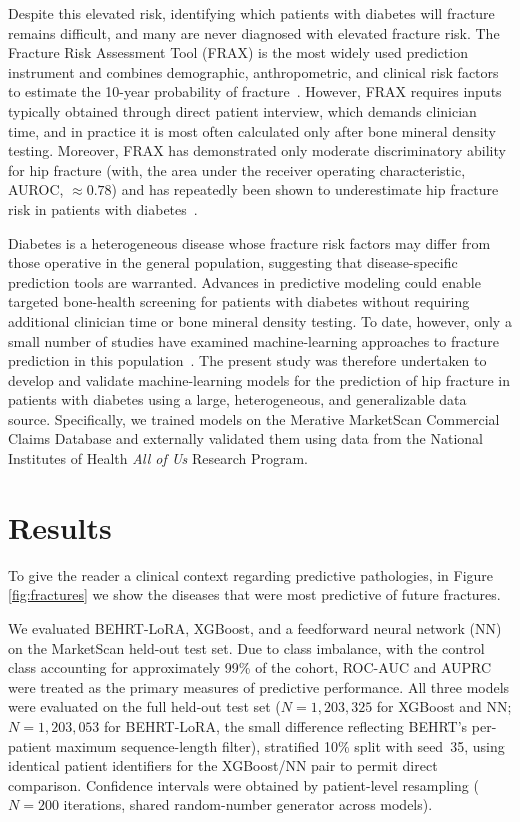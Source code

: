 \documentclass[12pt]{article}
\begin{document}
Despite this elevated risk, identifying which patients with diabetes will fracture remains difficult, and many are never diagnosed with elevated fracture risk. The Fracture Risk Assessment Tool (FRAX) is the most widely used prediction instrument and combines demographic, anthropometric, and clinical risk factors to estimate the 10-year probability of fracture~\citep{Kanis2010FRAX}. However, FRAX requires inputs typically obtained through direct patient interview, which demands clinician time, and in practice it is most often calculated only after bone mineral density testing. Moreover, FRAX has demonstrated only moderate discriminatory ability for hip fracture (with, the area under the receiver operating characteristic, AUROC, $\approx 0.78$) and has repeatedly been shown to underestimate hip fracture risk in patients with diabetes~\citep{Giangregorio2012JBMR,Beaudoin2019OsteoInt,Jain2025JBMR}.

Diabetes is a heterogeneous disease whose fracture risk factors may differ from those operative in the general population, suggesting that disease-specific prediction tools are warranted. Advances in predictive modeling could enable targeted bone-health screening for patients with diabetes without requiring additional clinician time or bone mineral density testing. To date, however, only a small number of studies have examined machine-learning approaches to fracture prediction in this population~\citep{Li2023JOSR}. The present study was therefore undertaken to develop and validate machine-learning models for the prediction of hip fracture in patients with diabetes using a large, heterogeneous, and generalizable data source. Specifically, we trained models on the Merative MarketScan Commercial Claims Database and externally validated them using data from the National Institutes of Health \textit{All of Us} Research Program.


\section{Results}

To give the reader a clinical context regarding predictive pathologies, in Figure \ref{fig:fractures} we show the diseases that were most predictive of future fractures.

We evaluated BEHRT-LoRA, XGBoost, and a feedforward neural network (NN) on the MarketScan held-out test set. Due to class imbalance, with the control class accounting for approximately 99\% of the cohort, ROC-AUC and AUPRC were treated as the primary measures of predictive performance. All three models were evaluated on the full held-out test set ($N=1{,}203{,}325$ for XGBoost and NN; $N=1{,}203{,}053$ for BEHRT-LoRA, the small difference reflecting BEHRT's per-patient maximum sequence-length filter), stratified 10\% split with seed~35, using identical patient identifiers for the XGBoost/NN pair to permit direct comparison. Confidence intervals were obtained by patient-level resampling ($N=200$ iterations, shared random-number generator across models).
\end{document}
